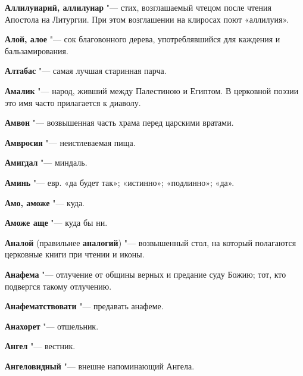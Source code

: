 \begin{mymulticols}{2}
\noindent\textbf{Аллилуиарий, аллилуиар} "--- стих, возглашаемый чтецом после чтения Апостола на Литургии. При этом возглашении на клиросах поют «аллилуия». 




\noindent\textbf{Алой, алое} "--- сок благовонного дерева, употреблявшийся для каждения и бальзамирования. 




\noindent\textbf{Алтабас} "--- самая лучшая старинная парча. 




\noindent\textbf{Амалик} "--- народ, живший между Палестиною и Египтом. В церковной поэзии это имя часто прилагается к диаволу. 




\noindent\textbf{Амвон} "--- возвышенная часть храма перед царскими вратами. 




\noindent\textbf{Амвросия} "--- неистлеваемая пища. 




\noindent\textbf{Амигдал} "--- миндаль. 




\noindent\textbf{Аминь} "--- евр. «да будет так»; «истинно»; «подлинно»; «да». 




\noindent\textbf{Амо, аможе} "--- куда. 




\noindent\textbf{Аможе аще} "--- куда бы ни. 




\noindent\textbf{Аналой} (правильнее \noindent\textbf{аналогий}) "--- возвышенный стол, на который полагаются церковные книги при чтении и иконы. 




\noindent\textbf{Анафема} "--- отлучение от общины верных и предание суду Божию; тот, кто подвергся такому отлучению. 




\noindent\textbf{Анафематствовати} "--- предавать анафеме. 




\noindent\textbf{Анахорет} "--- отшельник. 




\noindent\textbf{Ангел} "--- вестник. 




\noindent\textbf{Ангеловидный} "--- внешне напоминающий Ангела. 





\end{mymulticols}
